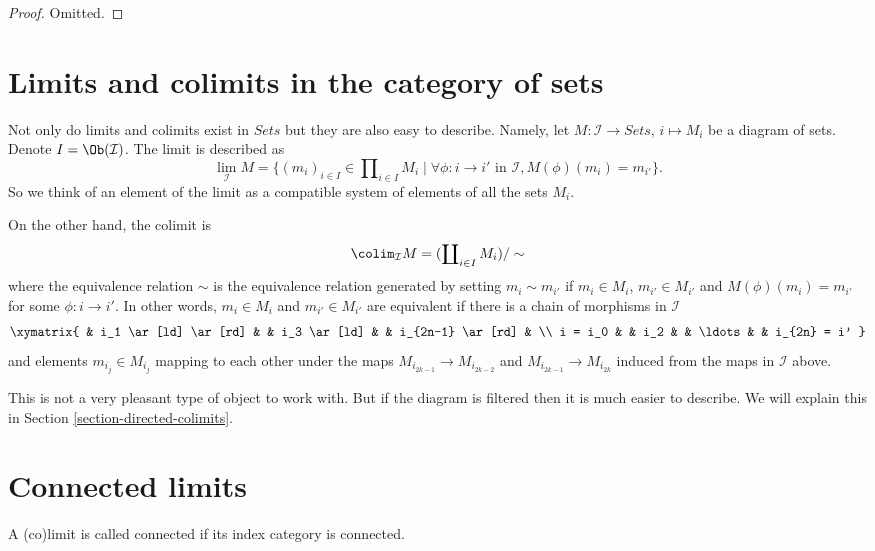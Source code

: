 \begin{proof}
Omitted.
\end{proof}







\section{Limits and colimits in the category of sets}
\label{section-limit-sets}

\noindent
Not only do limits and colimits exist in $\textit{Sets}$
but they are also easy to describe. Namely, let $M : \mathcal{I}
\to \textit{Sets}$, $i \mapsto M_i$ be a diagram of sets.
Denote $I = \Ob(\mathcal{I})$.
The limit is described as
$$
\lim_\mathcal{I} M
=
\{
(m_i)_{i\in I} \in \prod\nolimits_{i\in I} M_i
\mid
\forall \phi : i \to i' \text{ in }\mathcal{I},
M(\phi)(m_i) = m_{i'}
\}.
$$
So we think of an element of the limit as a compatible system of elements
of all the sets $M_i$.

\medskip\noindent
On the other hand, the colimit is
$$
\colim_\mathcal{I} M
=
(\coprod\nolimits_{i\in I} M_i)/\sim
$$
where the equivalence relation $\sim$ is the equivalence relation
generated by setting $m_i \sim m_{i'}$ if $m_i \in M_i$,
$m_{i'} \in M_{i'}$ and $M(\phi)(m_i) = m_{i'}$ for some
$\phi : i \to i'$. In other words, $m_i \in M_i$
and $m_{i'} \in M_{i'}$ are equivalent if there is a
chain of morphisms in $\mathcal{I}$
$$
\xymatrix{
&
i_1 \ar[ld] \ar[rd] & &
i_3 \ar[ld] & &
i_{2n-1} \ar[rd] & \\
i = i_0 & &
i_2 & &
\ldots & &
i_{2n} = i'
}
$$
and elements $m_{i_j} \in M_{i_j}$ mapping to each other under
the maps $M_{i_{2k-1}} \to M_{i_{2k-2}}$ and $M_{i_{2k-1}}
\to M_{i_{2k}}$ induced from the maps in $\mathcal{I}$ above.

\medskip\noindent
This is not a very pleasant type of object to work with.
But if the diagram is filtered then it is much easier to
describe. We will explain this in Section \ref{section-directed-colimits}.



\section{Connected limits}
\label{section-connected-limits}

\noindent
A (co)limit is called connected if its index category is connected.

